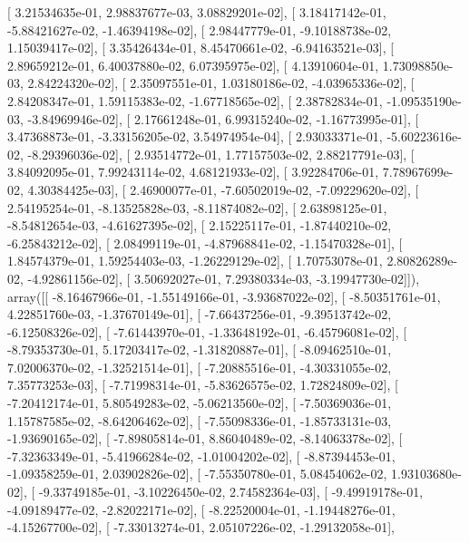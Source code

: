 \documentclass{article}
\begin{document}
       [  3.21534635e-01,   2.98837677e-03,   3.08829201e-02],
       [  3.18417142e-01,  -5.88421627e-02,  -1.46394198e-02],
       [  2.98447779e-01,  -9.10188738e-02,   1.15039417e-02],
       [  3.35426434e-01,   8.45470661e-02,  -6.94163521e-03],
       [  2.89659212e-01,   6.40037880e-02,   6.07395975e-02],
       [  4.13910604e-01,   1.73098850e-03,   2.84224320e-02],
       [  2.35097551e-01,   1.03180186e-02,  -4.03965336e-02],
       [  2.84208347e-01,   1.59115383e-02,  -1.67718565e-02],
       [  2.38782834e-01,  -1.09535190e-03,  -3.84969946e-02],
       [  2.17661248e-01,   6.99315240e-02,  -1.16773995e-01],
       [  3.47368873e-01,  -3.33156205e-02,   3.54974954e-04],
       [  2.93033371e-01,  -5.60223616e-02,  -8.29396036e-02],
       [  2.93514772e-01,   1.77157503e-02,   2.88217791e-03],
       [  3.84092095e-01,   7.99243114e-02,   4.68121933e-02],
       [  3.92284706e-01,   7.78967699e-02,   4.30384425e-03],
       [  2.46900077e-01,  -7.60502019e-02,  -7.09229620e-02],
       [  2.54195254e-01,  -8.13525828e-03,  -8.11874082e-02],
       [  2.63898125e-01,  -8.54812654e-03,  -4.61627395e-02],
       [  2.15225117e-01,  -1.87440210e-02,  -6.25843212e-02],
       [  2.08499119e-01,  -4.87968841e-02,  -1.15470328e-01],
       [  1.84574379e-01,   1.59254403e-03,  -1.26229129e-02],
       [  1.70753078e-01,   2.80826289e-02,  -4.92861156e-02],
       [  3.50692027e-01,   7.29380334e-03,  -3.19947730e-02]]), array([[ -8.16467966e-01,  -1.55149166e-01,  -3.93687022e-02],
       [ -8.50351761e-01,   4.22851760e-03,  -1.37670149e-01],
       [ -7.66437256e-01,  -9.39513742e-02,  -6.12508326e-02],
       [ -7.61443970e-01,  -1.33648192e-01,  -6.45796081e-02],
       [ -8.79353730e-01,   5.17203417e-02,  -1.31820887e-01],
       [ -8.09462510e-01,   7.02006370e-02,  -1.32521514e-01],
       [ -7.20885516e-01,  -4.30331055e-02,   7.35773253e-03],
       [ -7.71998314e-01,  -5.83626575e-02,   1.72824809e-02],
       [ -7.20412174e-01,   5.80549283e-02,  -5.06213560e-02],
       [ -7.50369036e-01,   1.15787585e-02,  -8.64206462e-02],
       [ -7.55098336e-01,  -1.85733131e-03,  -1.93690165e-02],
       [ -7.89805814e-01,   8.86040489e-02,  -8.14063378e-02],
       [ -7.32363349e-01,  -5.41966284e-02,  -1.01004202e-02],
       [ -8.87394453e-01,  -1.09358259e-01,   2.03902826e-02],
       [ -7.55350780e-01,   5.08454062e-02,   1.93103680e-02],
       [ -9.33749185e-01,  -3.10226450e-02,   2.74582364e-03],
       [ -9.49919178e-01,  -4.09189477e-02,  -2.82022171e-02],
       [ -8.22520004e-01,  -1.19448276e-01,  -4.15267700e-02],
       [ -7.33013274e-01,   2.05107226e-02,  -1.29132058e-01],
\end{document}
